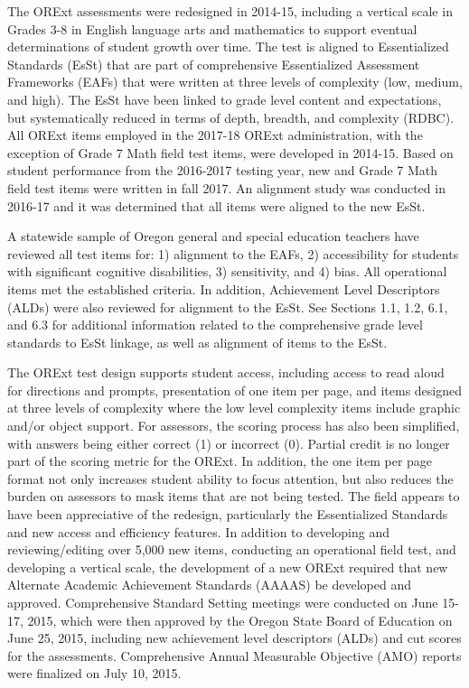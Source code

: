 \documentclass[]{article}
\begin{document}
The ORExt assessments were redesigned in 2014-15, including a vertical
scale in Grades 3-8 in English language arts and mathematics to support
eventual determinations of student growth over time. The test is aligned
to Essentialized Standards (EsSt) that are part of comprehensive
Essentialized Assessment Frameworks (EAFs) that were written at three
levels of complexity (low, medium, and high). The EsSt have been linked
to grade level content and expectations, but systematically reduced in
terms of depth, breadth, and complexity (RDBC). All ORExt items employed
in the 2017-18 ORExt administration, with the exception of Grade 7 Math
field test items, were developed in 2014-15. Based on student
performance from the 2016-2017 testing year, new and Grade 7 Math field
test items were written in fall 2017. An alignment study was conducted
in 2016-17 and it was determined that all items were aligned to the new
EsSt.

A statewide sample of Oregon general and special education teachers have
reviewed all test items for: 1) alignment to the EAFs, 2) accessibility
for students with significant cognitive disabilities, 3) sensitivity,
and 4) bias. All operational items met the established criteria. In
addition, Achievement Level Descriptors (ALDs) were also reviewed for
alignment to the EsSt. See Sections 1.1, 1.2, 6.1, and 6.3 for
additional information related to the comprehensive grade level
standards to EsSt linkage, as well as alignment of items to the EsSt.

The ORExt test design supports student access, including access to read
aloud for directions and prompts, presentation of one item per page, and
items designed at three levels of complexity where the low level
complexity items include graphic and/or object support. For assessors,
the scoring process has also been simplified, with answers being either
correct (1) or incorrect (0). Partial credit is no longer part of the
scoring metric for the ORExt. In addition, the one item per page format
not only increases student ability to focus attention, but also reduces
the burden on assessors to mask items that are not being tested. The
field appears to have been appreciative of the redesign, particularly
the Essentialized Standards and new access and efficiency features. In
addition to developing and reviewing/editing over 5,000 new items,
conducting an operational field test, and developing a vertical scale,
the development of a new ORExt required that new Alternate Academic
Achievement Standards (AAAAS) be developed and approved. Comprehensive
Standard Setting meetings were conducted on June 15-17, 2015, which were
then approved by the Oregon State Board of Education on June 25, 2015,
including new achievement level descriptors (ALDs) and cut scores for
the assessments. Comprehensive Annual Measurable Objective (AMO) reports
were finalized on July 10, 2015.
\end{document}
